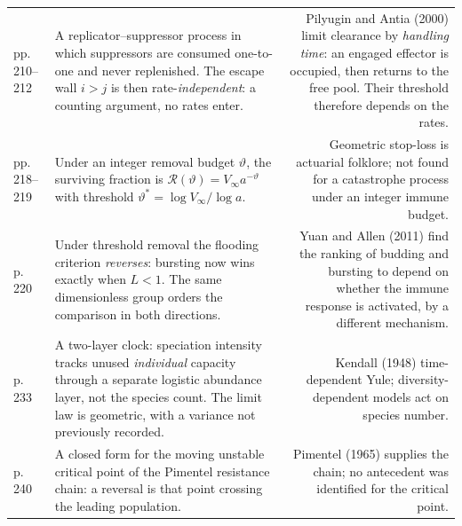 {\begin{xltabular}{\linewidth}{@{}WZN@{}}
\newline pp.\,210--212 &
A replicator--suppressor process in which suppressors are consumed one-to-one and never
replenished. The escape wall $i>j$ is then rate-\emph{independent}: a counting argument, no
rates enter. &
Pilyugin and Antia (2000) limit clearance by \emph{handling time}: an engaged effector is
occupied, then returns to the free pool. Their threshold therefore depends on the rates. \\
\addlinespace[3pt]

\newline pp.\,218--219 &
Under an integer removal budget $\vartheta$, the surviving fraction is
$\mathcal{R}(\vartheta)=V_\infty a^{-\vartheta}$ with threshold
$\vartheta^\ast=\log V_\infty/\log a$. &
Geometric stop-loss is actuarial folklore; not found for a catastrophe process under an
integer immune budget. \\
\addlinespace[3pt]

\newline p.\,220 &
Under threshold removal the flooding criterion \emph{reverses}: bursting now wins exactly
when $L<1$. The same dimensionless group orders the comparison in both directions. &
Yuan and Allen (2011) find the ranking of budding and bursting to depend on whether the immune
response is activated, by a different mechanism. \\
\addlinespace[3pt]

\newline p.\,233 &
A two-layer clock: speciation intensity tracks unused \emph{individual} capacity through a
separate logistic abundance layer, not the species count. The limit law is geometric, with
a variance not previously recorded. &
Kendall (1948) time-dependent Yule; diversity-dependent models act on species number. \\
\addlinespace[3pt]

\newline p.\,240 &
A closed form for the moving unstable critical point of the Pimentel resistance chain: a
reversal is that point crossing the leading population. &
Pimentel (1965) supplies the chain; no antecedent was identified for the critical point. \\
\end{xltabular}\par}


